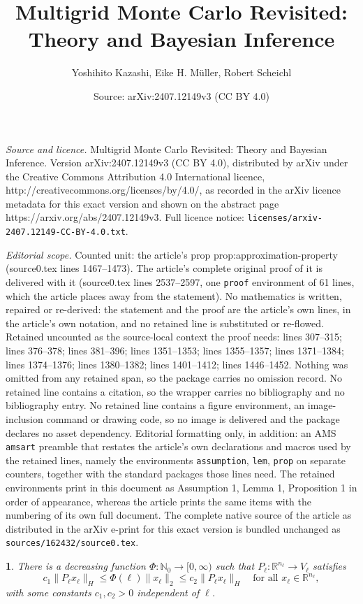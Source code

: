 \documentclass[10pt,a4paper]{amsart}
\title{Multigrid Monte Carlo Revisited: Theory and Bayesian Inference}
\author{Yoshihito Kazashi, Eike H. M\"uller, Robert Scheichl}
\date{Source: arXiv:2407.12149v3 (CC BY 4.0)}
\newtheorem{assumption}{}
\begin{document}
\maketitle

\noindent\emph{Source and licence.} Multigrid Monte Carlo Revisited: Theory and Bayesian Inference. Version arXiv:2407.12149v3 (CC BY 4.0), distributed by arXiv under the Creative Commons Attribution 4.0 International licence, http://creativecommons.org/licenses/by/4.0/, as recorded in the arXiv licence metadata for this exact version and shown on the abstract page https://arxiv.org/abs/2407.12149v3. Full licence notice: \texttt{licenses/arxiv-2407.12149-CC-BY-4.0.txt}.\par\smallskip

\noindent\textit{Editorial scope.} Counted unit: the article's prop prop:approximation-property (source0.tex lines 1467--1473). The article's complete original proof of it is delivered with it (source0.tex lines 2537--2597, one \texttt{proof} environment of 61 lines, which the article places away from the statement). No mathematics is written, repaired or re-derived: the statement and the proof are the article's own lines, in the article's own notation, and no retained line is substituted or re-flowed.  Retained uncounted as the source-local context the proof needs: lines 307--315; lines 376--378; lines 381--396; lines 1351--1353; lines 1355--1357; lines 1371--1384; lines 1374--1376; lines 1380--1382; lines 1401--1412; lines 1446--1452.  Nothing was omitted from any retained span, so the package carries no omission record.  No retained line contains a citation, so the wrapper carries no bibliography and no bibliography entry.  No retained line contains a figure environment, an image-inclusion command or drawing code, so no image is delivered and the package declares no asset dependency.  Editorial formatting only, in addition: an AMS \texttt{amsart} preamble that restates the article's own declarations and macros used by the retained lines, namely the environments \texttt{assumption}, \texttt{lem}, \texttt{prop} on separate counters, together with the standard packages those lines need.  The retained environments print in this document as Assumption 1, Lemma 1, Proposition 1 in order of appearance, whereas the article prints the same items with the numbering of its own full document.  The complete native source of the article as distributed in the arXiv e-print for this exact version is bundled unchanged as \texttt{sources/162432/source0.tex}.
\begin{assumption}
	\label{assu:Pell}There is a decreasing function
        $\Phi\colon\mathbb{N}_{0}\to[0,\infty)$ such that %
        $P_{\ell}\colon\mathbb{R}^{n_{\ell}}\to V_{\ell}$ satisfies
	\begin{equation}
		c_{1}\|P_{\ell}x_{\ell}\|_{H}\leq\Phi(\ell)\|x_{\ell}\|_{2}\leq c_{2}\|P_{\ell}x_{\ell}\|_{H}\quad\text{for all }x_{\ell}\in\mathbb{R}^{n_{\ell}},\label{eq:Pl-property}
	\end{equation}
	with some constants $c_1,c_2>0$ independent of $\ell$.
\end{assumption}
\end{document}
